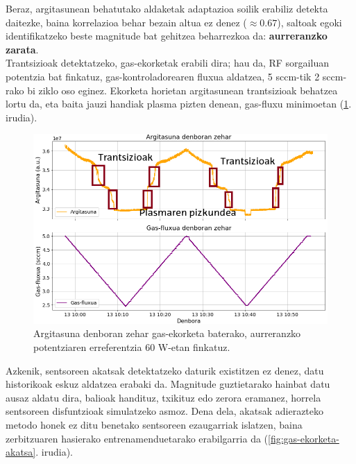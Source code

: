 \documentclass[12pt]{article}
\numberwithin{figure}{section}
\numberwithin{equation}{section}
\begin{document}
Beraz, argitasunean behatutako aldaketak adaptazioa soilik erabiliz detekta daitezke, baina korrelazioa behar bezain altua ez denez ($\approx0.67$), saltoak egoki identifikatzeko beste magnitude bat gehitzea beharrezkoa da: \textbf{aurreranzko zarata}.\\

Trantsizioak detektatzeko, gas-ekorketak erabili dira; hau da, RF sorgailuan potentzia bat finkatuz, gas-kontroladorearen fluxua aldatzea, 5 sccm-tik 2 sccm-rako bi ziklo oso eginez. Ekorketa horietan argitasunean trantsizioak behatzea lortu da, eta baita jauzi handiak plasma pizten denean, gas-fluxu minimoetan (\ref{fig:gas-ekorketa60w}. irudia).

\begin{figure}[h]
    \centering
    \includegraphics[width=0.9\linewidth]{3 - Neurketak/gas-ekorketa_60w.png}
    \caption{Argitasuna denboran zehar gas-ekorketa baterako, aurreranzko potentziaren erreferentzia 60 W-etan finkatuz.}
    \label{fig:gas-ekorketa60w}
\end{figure}

Azkenik, sentsoreen akatsak detektatzeko daturik existitzen ez denez, datu historikoak eskuz aldatzea erabaki da. Magnitude guztietarako hainbat datu ausaz aldatu dira, balioak handituz, txikituz edo zerora eramanez, horrela sentsoreen disfuntzioak simulatzeko asmoz. Dena dela, akatsak adierazteko metodo honek ez ditu benetako sentsoreen ezaugarriak islatzen, baina zerbitzuaren hasierako entrenamenduetarako erabilgarria da (\ref{fig:gas-ekorketa-akatsa}. irudia).
\end{document}
